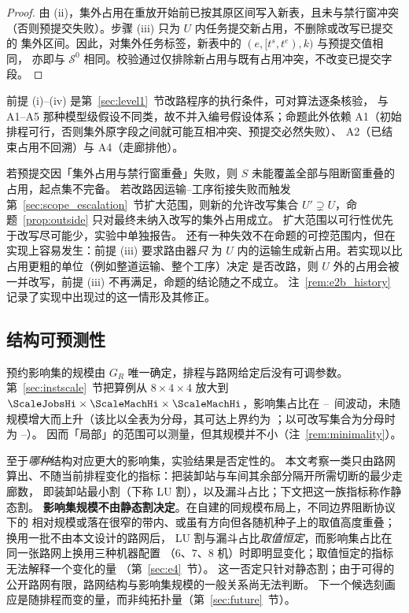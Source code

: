 \begin{proof}
由 (ii)，集外占用在重放开始前已按其原区间写入新表，且未与禁行窗冲突
（否则预提交失败）。步骤 (iii) 只为 \(U\) 内任务提交新占用，不删除或改写已提交的
集外区间。因此，对集外任务标签，新表中的 \((e,[t^s,t^e),k)\) 与预提交值相同，
亦即与 \(\mathcal{S}^0\) 相同。校验通过仅排除新占用与既有占用冲突，不改变已提交字段。
\end{proof}

前提 (i)--(iv) 是第~\ref{sec:level1}~节改路程序的执行条件，可对算法逐条核验，
与 A1--A5 那种模型级假设不同类，故不并入编号假设体系；命题此外依赖
A1（初始排程可行，否则集外原字段之间就可能互相冲突、预提交必然失败）、
A2（已结束占用不回溯）与 A4（走廊排他）。

\begin{remark}
\label{rem:precommit}
若预提交因「集外占用与禁行窗重叠」失败，则 \(S\) 未能覆盖全部与阻断窗重叠的占用，起点集不完备。
若改路因运输--工序衔接失败而触发第~\ref{sec:scope_escalation}~节扩大范围，则新的允许改写集合
\(U'\supsetneq U\)，命题~\ref{prop:outside} 只对最终未纳入改写的集外占用成立。
扩大范围以可行性优先于改写尽可能少，实验中单独报告。
还有一种失效不在命题的可控范围内，但在实现上容易发生：前提 (iii) 要求路由器\emph{只}
为 \(U\) 内的运输生成新占用。若实现以比占用更粗的单位（例如整道运输、整个工序）决定
是否改路，则 \(U\) 外的占用会被一并改写，前提 (iii) 不再满足，命题的结论随之不成立。
注~\ref{rem:e2b_history} 记录了实现中出现过的这一情形及其修正。
\end{remark}

\subsection{结构可预测性}
\label{sec:structure}

预约影响集的规模由 \(G_R\) 唯一确定，排程与路网给定后没有可调参数。第~\ref{sec:instscale}~节把算例从 \(8\times4\times4\) 放大到
\(\ScaleJobsHi\times\ScaleMachHi\times\ScaleMachHi\)，影响集占比在
\ScaleCloLo--\ScaleCloHi\ 间波动，未随规模增大而上升（该比以全表为分母，其可达上界约为
\ScaleAliveShare；以可改写集合为分母时为 \ScaleCloAliveLo--\ScaleCloAliveHi）。
因而「局部」的范围可以测量，但其规模并不小（注~\ref{rem:minimality}）。

至于\emph{哪种}结构对应更大的影响集，实验结果是否定性的。
本文考察一类只由路网算出、不随当前排程变化的指标：把装卸站与车间其余部分隔开所需切断的最少走廊数，
即装卸站最小割（下称 LU 割），以及漏斗占比；下文把这一族指标称作静态割。
\textbf{影响集规模不由静态割决定}。在自建的同规模布局上，不同边界阻断协议下的
相对规模或落在很窄的带内、或虽有方向但各随机种子上的取值高度重叠；换用一批不由本文设计的路网后，
LU 割与漏斗占比\emph{取值恒定}，而影响集占比在同一张路网上换用三种机器配置
（\(6\)、\(7\)、\(8\) 机）时即明显变化；取值恒定的指标无法解释一个变化的量
（第~\ref{sec:e4}~节）。
这一否定只针对静态割；由于可得的公开路网有限，路网结构与影响集规模的一般关系尚无法判断。
下一个候选刻画应是随排程而变的量，而非纯拓扑量（第~\ref{sec:future}~节）。

